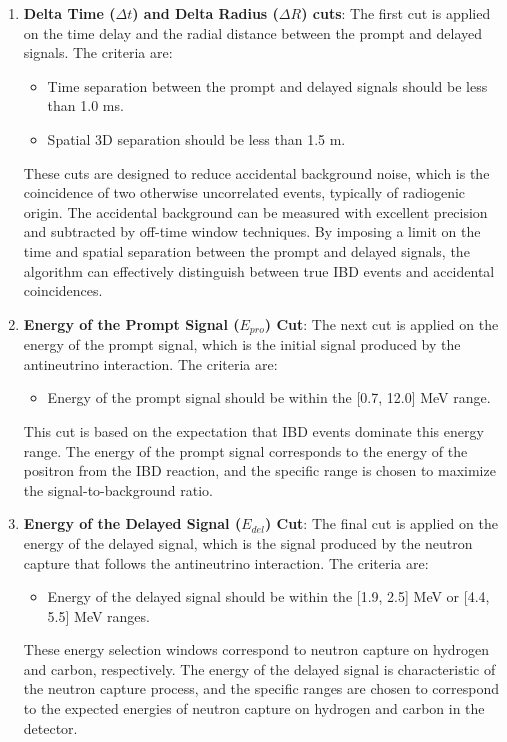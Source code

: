 \begin{enumerate}
	\item \textbf{Delta Time ($\Delta t$) and Delta Radius ($\Delta R$) cuts}: The first cut is applied on the time delay and the radial distance between the prompt and delayed signals. The criteria are:
	\begin{itemize}
		\item Time separation between the prompt and delayed signals should be less than 1.0 ms.
		\item Spatial 3D separation should be less than 1.5 m.
	\end{itemize}

	These cuts are designed to reduce accidental background noise, which is the coincidence of two otherwise uncorrelated events, typically of radiogenic origin. The accidental background can be measured with excellent precision and subtracted by off-time window techniques. By imposing a limit on the time and spatial separation between the prompt and delayed signals, the algorithm can effectively distinguish between true IBD events and accidental coincidences.
	\item \textbf{Energy of the Prompt Signal ($E_{pro}$) Cut}: The next cut is applied on the energy of the prompt signal, which is the initial signal produced by the antineutrino interaction. The criteria are:
	\begin{itemize}
		\item Energy of the prompt signal should be within the [0.7, 12.0] MeV range.
	\end{itemize}
	
	This cut is based on the expectation that IBD events dominate this energy range. The energy of the prompt signal corresponds to the energy of the positron from the IBD reaction, and the specific range is chosen to maximize the signal-to-background ratio.
	\item \textbf{Energy of the Delayed Signal ($E_{del}$) Cut}: The final cut is applied on the energy of the delayed signal, which is the signal produced by the neutron capture that follows the antineutrino interaction. The criteria are:
	\begin{itemize}
		\item Energy of the delayed signal should be within the [1.9, 2.5] MeV or [4.4, 5.5] MeV ranges.
	\end{itemize}
	
	These energy selection windows correspond to neutron capture on hydrogen and carbon, respectively. The energy of the delayed signal is characteristic of the neutron capture process, and the specific ranges are chosen to correspond to the expected energies of neutron capture on hydrogen and carbon in the detector.
\end{enumerate}

